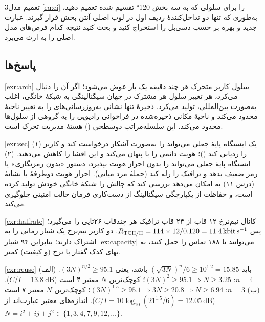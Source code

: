 \documentclass[11pt,a4paper]{article}
\begin{document}
\begin{exercisebox}{3}{تعمیم مدل }\label{exr:ci3}
\cref{eq:ci} را برای سلولی که به سه بخش \ang{120} تقسیم شده تعمیم دهید، به‌طوری که تنها دو
تداخل‌کنندهٔ ردیف اول در لوب اصلی آنتن بخش قرار گیرند. عبارت جدید و بهره بر حسب دسی‌بل را
استخراج کنید و بحث کنید نتیجه کدام فرض‌های مدل اصلی را به ارث می‌برد.
\end{exercisebox}

\subsection*{پاسخ‌ها}

\begin{solutionbox}{\ref{exr:arch}}
سلول کاربر متحرک هر چند دقیقه یک بار عوض می‌شود؛ اگر  آن را دنبال می‌کرد، هر تغییر
سلول هر مشترک در جهان سیگنالینگی به شبکهٔ خانگی، اغلب به‌صورت بین‌المللی، تولید می‌کرد.
ذخیرهٔ تنها نشانی  به‌روزرسانی‌های  را به تغییر ناحیهٔ  محدود
می‌کند و ناحیهٔ مکانی ذخیره‌شده در  فراخوانی رادیویی را به گروهی از سلول‌ها محدود
می‌کند. این سلسله‌مراتب دوسطحی () هستهٔ مدیریت تحرک  است.
\end{solutionbox}

\begin{solutionbox}{\ref{exr:sec}}
(۱) یک ایستگاه پایهٔ جعلی می‌تواند  را به‌صورت آشکار درخواست کند و کاربر را
ردیابی کند ()؛  هویت دائمی را با  پنهان می‌کند و
 این افشا را کاهش می‌دهند. (۲) ایستگاه پایهٔ جعلی می‌تواند  را بدون
احراز هویت بپذیرد، دستور «بدون رمزنگاری» یا رمز ضعیف بدهد و ترافیک را رله کند (حملهٔ
مرد میانی). احراز هویت دوطرفهٔ  با نشانهٔ  (درس ۱۱) به 
امکان می‌دهد بررسی کند که چالش را شبکهٔ خانگی خودش تولید کرده است، و حفاظت از یکپارچگی
سیگنالینگ از دست‌کاری فرمان حالت امنیتی جلوگیری می‌کند.
\end{solutionbox}

\begin{solutionbox}{\ref{exr:halfrate}}
کانال نیم‌نرخ ۱۲ قاب از ۲۴ قاب ترافیک هر چندقاب ۲۶تایی را می‌گیرد؛ پس
$R_{\mathrm{TCH/H}} = 114\times 12/0.120 = \qty{11.4}{\kilo\bit\per\second}$. دو کاربر نیم‌نرخ
یک شیار زمانی را به اشتراک دارند؛ بنابراین ۹۴ شیار \cref{ex:capacity} می‌توانند تا ۱۸۸ تماس
را حمل کنند، به بهای کدک گفتار با نرخ (و کیفیت) کمتر.
\end{solutionbox}

\begin{solutionbox}{\ref{exr:reuse}}
باید $(\sqrt{3N})^n/6 \ge 10^{1.2} = 15.85$ باشد، یعنی $(3N)^{n/2}\ge 95.1$.
(الف) $n=4$: $(3N)^2\ge 95.1 \Rightarrow N\ge 3.25$؛ کوچک‌ترین $N$ معتبر ۴ است
($C/I=\qty{13.8}{\dB}$). (ب) $n=3$: $(3N)^{1.5}\ge95.1 \Rightarrow 3N\ge 20.8 \Rightarrow N\ge 6.94$؛
کوچک‌ترین $N$ معتبر ۷ است ($C/I = 10\log_{10}(21^{1.5}/6) = \qty{12.05}{\dB}$).
اندازه‌های معتبر عبارت‌اند از $N = i^2+ij+j^2 \in\{1,3,4,7,9,12,\dots\}$.
\end{solutionbox}
\end{document}
